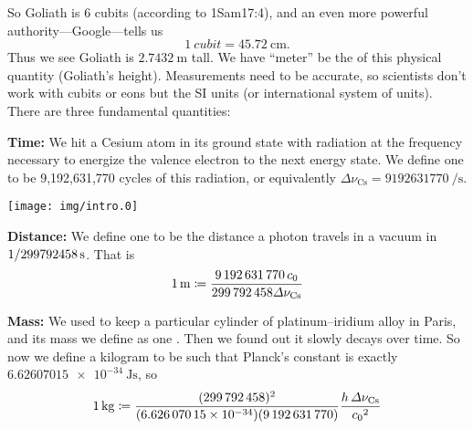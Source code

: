 So Goliath is 6 cubits (according to 1Sam17:4), and an even more
powerful authority---Google---tells us
\begin{equation}
\SI{1}{cubit}=\SI{45.72}{\centi\meter}.
\end{equation}
Thus we see Goliath is $\SI{2.7432}{\meter}$ tall. We have
``meter'' be the  of this physical quantity
(Goliath's height). Measurements need to be accurate, so
scientists don't work with cubits or eons but the SI units (or
international system of units). There are three fundamental
quantities:

\noindent\textbf{Time:\quad}\ignorespaces%
We hit a Cesium atom in its ground state with radiation at the
frequency necessary to energize the valence electron to the next
energy state. We define one  to be 9,192,631,770
cycles of this radiation, or equivalently $\Delta\nu_{\mathrm{Cs}}=\SI{9192631770}{\per\second}$.
\begin{center}
\texttt{[image: img/intro.0]}
\end{center}
\textbf{Distance:\quad}\ignorespaces%
We define one  to be the distance a photon travels
in a vacuum in $\SI[parse-numbers = false]{1/299792458}{\second}$. That is
\begin{equation}
\SI{1}{\meter} \eqDef \frac{\SI{9192631770}{\clight}}{299\,792\,458\Delta\nu_{\mathrm{Cs}}}
\end{equation}

\noindent\textbf{Mass:\quad}\ignorespaces%
We used to keep a particular cylinder of platinum--iridium alloy in
Paris, and its mass we define as one
. Then we found out it slowly
decays over time. So now we define a kilogram to be such that Planck's
constant is exactly $\SI{6.62607015e-34}{\joule\second}$, so
\begin{equation}
\SI{1}{\kilogram} \eqDef \frac{(299\,792\,458)^{2}}{(6.626\,070\,15\times10^{-34})(9\,192\,631\,770)}\frac{h\,\Delta\nu_{\mathrm{Cs}}}{\si{\clight}^{2}}
\end{equation}

